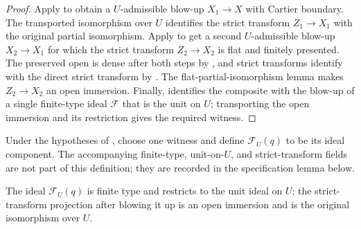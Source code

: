 \begin{proof}
  Apply  to obtain a
  $U$-admissible blow-up $X_1\to X$ with Cartier boundary.  The transported
  isomorphism over $U$ identifies the strict transform $Z_1\to X_1$ with the
  original partial isomorphism.  Apply
   to get a second
  $U$-admissible blow-up $X_2\to X_1$ for which the strict transform
  $Z_2\to X_2$ is flat and finitely presented.  The preserved open is dense
  after both steps by
  , and strict
  transforms identify with the direct strict transform by
  .  The flat-partial-isomorphism
  lemma makes $Z_2\to X_2$ an open immersion.  Finally,
   identifies the composite with the
  blow-up of a single finite-type ideal $\mathcal F$ that is the unit on $U$;
  transporting the open immersion and its restriction gives the required
  witness.
\end{proof}

\begin{definition}
  \label{def:nagata-flattening-ideal}

  Under the hypotheses of
  , choose one witness and define
  $\mathcal F_U(q)$ to be its ideal component.  The accompanying finite-type,
  unit-on-$U$, and strict-transform fields are not part of this definition;
  they are recorded in the specification lemma below.
\end{definition}

\begin{lemma}
  \label{lemma:nagata-flattening-ideal}

  The ideal $\mathcal F_U(q)$ is finite type and restricts to the unit ideal
  on $U$; the strict-transform projection after blowing it up is an open
  immersion and is the original isomorphism over $U$.
\end{lemma}

